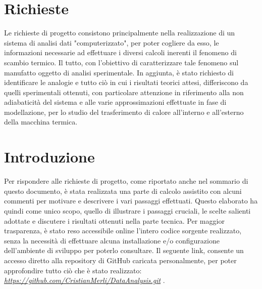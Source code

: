 \documentclass[a4paper,10pt]{article}                                                                                       %
\begin{document}
\section{Richieste}                                                                                                         %
\label{sec:project_request}                                                                                                 %
  Le richieste di progetto consistono principalmente nella realizzazione di un sistema di analisi dati "computerizzato",
  per poter cogliere da esso, le informazioni necessarie ad effettuare i diversi calcoli inerenti il fenomeno di scambio
  termico. Il tutto, con l'obiettivo di caratterizzare tale fenomeno sul manufatto oggetto di analisi sperimentale. In
  aggiunta, è stato richiesto di identificare le analogie e tutto ciò in cui i risultati teorici attesi, differiscono da
  quelli sperimentali ottenuti, con particolare attenzione in riferimento alla non adiabaticità del sistema e alle varie
  approssimazioni effettuate in fase di modellazione, per lo studio del trasferimento di calore all'interno e all'esterno
  della macchina termica.

\section{Introduzione}                                                                                                      %
\label{sec:introduction}                                                                                                    %
  Per rispondere alle richieste di progetto, come riportato anche nel sommario di questo documento, è stata
  realizzata una parte di calcolo assistito con alcuni commenti per motivare e descrivere i vari passaggi effettuati.
  Questo elaborato ha quindi come unico scopo, quello di illustrare i passaggi cruciali, le scelte salienti adottate e
  discutere i risultati ottenuti nella parte tecnica. Per maggior trasparenza, è stato reso accessibile online l'intero
  codice sorgente realizzato, senza la necessità di effettuare alcuna installazione e/o configurazione dell'ambiente di
  sviluppo per poterlo consultare. Il seguente link, consente un accesso diretto alla repository di GitHub caricata
  personalmente, per poter approfondire tutto ciò che è stato realizzato:
  \textit{\href{https://github.com/CristianMerli/DataAnalysis.git}{https://github.com/CristianMerli/DataAnalysis.git}} .
\end{document}
